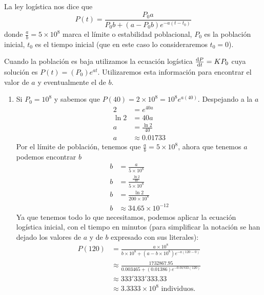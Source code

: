 \documentclass[14pt]{extarticle}
\begin{document}
\begin{enumerate}
{            \color{azul}
            La ley logística nos dice que
            \[
                P(t)=\frac{P_0 a}{P_0 b+(a-P_0 b)e^{-a(t-t_0)}}
            \]
            donde $\frac{a}{b}=5\times 10^8$ marca el límite o estabilidad
            poblacional, $P_0$ es la población inicial, $t_0$ es el tiempo
            inicial (que en este caso lo consideraremos $t_0=0$).

            Cuando la población es baja utilizamos la ecuación logística
            $\dv{P}{t}=KP_0$ cuya solución es $P(t)=(P_0)e^{at}$. Utilizaremos
            esta información para encontrar el valor de $a$ y eventualmente el
            de $b$.
            \begin{enumerate}
                \item Si $P_0=10^8$ y sabemos que
                $P(40)=2\times 10^8=10^8e^{a(40)}$. Despejando a la $a$
                \begin{align*}
                    2 &= e^{40a}\\
                    \ln{2} &= 40a\\
                    a &= \frac{\ln{2}}{40}\\
                    a &\approx 0.01733
                \end{align*}
                Por el límite de población, tenemos que
                $\frac{a}{b}=5\times 10^8$, ahora que tenemos $a$ podemos
                encontrar $b$
                \begin{align*}
                    b &= \frac{a}{5\times 10^8}\\[.2cm]
                    b &= \frac{\frac{\ln{2}}{40}}{5\times 10^8}\\[.2cm]
                    b &= \frac{\ln{2}}{200\times 10^8}\\[.2cm]
                    b &\approx 34.65\times 10^{-12}
                \end{align*}
                Ya que tenemos todo lo que necesitamos, podemos aplicar la
                ecuación logística inicial, con el tiempo en minutos (para
                simplificar la notación se han dejado los valores de $a$ y de
                $b$ expresado con sus literales):
                \begin{align*}
                    P(120) &= \frac{a\times 10^8}
                    {b\times 10^8+(a-b\times 10^8)e^{-a(120-0)}}\\[.3cm]
                    &\approx \frac{1732867.95}{0.003465+(0.01386)
                    e^{-0.01733(120)}}\\
                    &\approx 333'333'333.33\\
                    &\approx 3.3333\times 10^8 \text{ individuos.}
                \end{align*}


\end{enumerate}}
\end{enumerate}
\end{document}
